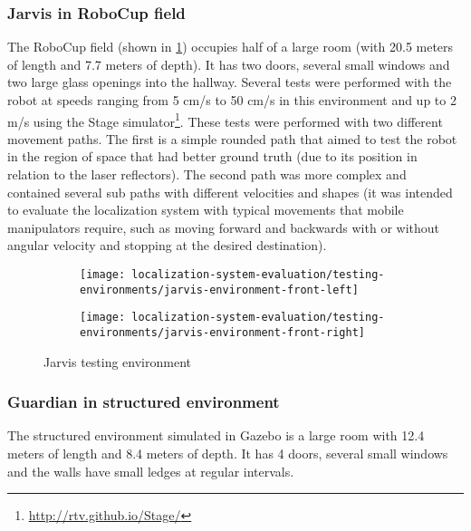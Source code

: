 \subsubsection{Jarvis in RoboCup field}

The RoboCup field (shown in \cref{fig:localization-system-evaluation_jarvis-tests-environment}) occupies half of a large room (with 20.5 meters of length and 7.7 meters of depth). It has two doors, several small windows and two large glass openings into the hallway. Several tests were performed with the robot at speeds ranging from 5 cm/s to 50 cm/s in this environment and up to 2 m/s using the Stage simulator\footnote{\url{http://rtv.github.io/Stage/}}. These tests were performed with two different movement paths. The first is a simple rounded path that aimed to test the robot in the region of space that had better ground truth (due to its position in relation to the laser reflectors). The second path was more complex and contained several sub paths with different velocities and shapes (it was intended to evaluate the localization system with typical movements that mobile manipulators require, such as moving forward and backwards with or without angular velocity and stopping at the desired destination).


\begin{figure}[hb]
	\centering
	\begin{subfigure}[ht]{0.3\textwidth}
		\centering
		\texttt{[image: localization-system-evaluation/testing-environments/jarvis-environment-front-left]}
	\end{subfigure}
	\begin{subfigure}[ht]{0.3\textwidth}
		\centering
		\texttt{[image: localization-system-evaluation/testing-environments/jarvis-environment-front-right]}
	\end{subfigure}
	\caption{Jarvis testing environment}
	\label{fig:localization-system-evaluation_jarvis-tests-environment}
\end{figure}


\subsubsection{Guardian in structured environment}

The structured environment simulated in Gazebo is a large room with 12.4 meters of length and 8.4 meters of depth. It has 4 doors, several small windows and the walls have small ledges at regular intervals.


